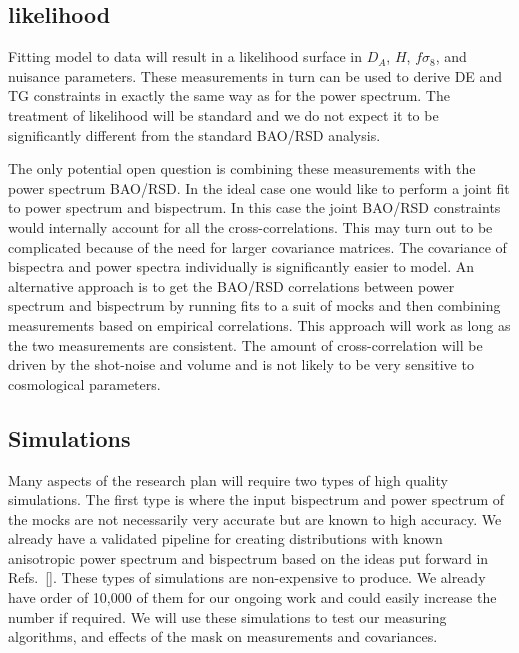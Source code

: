 \subsection*{likelihood}

Fitting model to data will result in a likelihood surface in $D_A$, $H$,
$f\sigma_8$, and nuisance parameters. These measurements in turn can be used to
derive DE and TG constraints in exactly the same way as for the power spectrum.
The treatment of likelihood will be standard and we do not expect it to be
significantly different from the standard BAO/RSD analysis. 

The only potential open question is combining these measurements with the power
spectrum BAO/RSD. In the ideal case one would like to perform a joint fit to
power spectrum and bispectrum. In this case the joint BAO/RSD constraints would
internally account for all the cross-correlations. This may turn out to be
complicated because of the need for larger covariance matrices. The covariance
of bispectra and power spectra individually is significantly easier to model.
An alternative approach is to get the BAO/RSD correlations between power
spectrum and bispectrum by running fits to a suit of mocks and then combining
measurements based on empirical correlations. This approach will work as long
as the two measurements are consistent. The amount of cross-correlation will
be driven by the shot-noise and volume and is not likely to be very sensitive
to cosmological parameters.

\subsection*{Simulations}

Many aspects of the research plan will require two types of high quality
simulations. The first type is where the input bispectrum and power spectrum of
the mocks are not necessarily very accurate but are known to high accuracy. We
already have a validated pipeline for creating distributions with known
anisotropic power spectrum and bispectrum based on the ideas put forward in
Refs.~[]. These types of simulations are non-expensive to produce. We already
have order of 10,000 of them for our ongoing work and could easily increase the
number if required. We will use these simulations to test our measuring
algorithms, and effects of the mask on measurements and covariances. 

